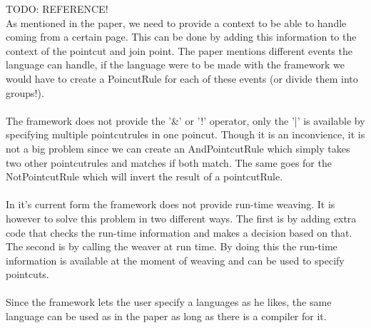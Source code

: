 \documentclass[a4paper]{report}
\begin{document}
TODO: REFERENCE!\\
As mentioned in the paper, we need to provide a context to be able to handle coming from a certain page. This can be done by adding this information to the context of the pointcut and join point. The paper mentions different events the language can handle, if the language were to be made with the framework we would have to create a PoincutRule for each of these events (or divide them into groups!).\\
\\
The framework does not provide the '\&' or '!' operator, only the '|' is available by specifying multiple pointcutrules in one poincut. Though it is an inconvience, it is not a big problem since we can create an AndPointcutRule which simply takes two other pointcutrules and matches if both match. The same goes for the NotPointcutRule which will invert the result of a pointcutRule.\\
\\
In it's current form the framework does not provide run-time weaving. It is however to solve this problem in two different ways. The first is by adding extra code that checks the run-time information and makes a decision based on that. The second is by calling the weaver at run time.  By doing this the run-time information is available at the moment of weaving and can be used to specify pointcuts.\\
\\
Since the framework lets the user specify a languages as he likes, the same language can be used as in the paper as long as there is a compiler for it.
\end{document}

